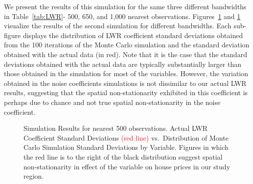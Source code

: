 \documentclass{article}\usepackage{graphicx, color}
\begin{document}
We present the results of this simulation for the same three different bandwidths in Table~\ref{tab:LWR}- 500, 650, and 1,000 nearest observations. Figures~\ref{fig:MCsds500} and \ref{fig:MCsds500} visualize the results of the second simulation for different bandwidths. Each sub-figure displays the distribution of LWR coefficient standard deviations obtained from the 100 iterations of the Monte Carlo simulation and the standard deviation obtained with the actual data (in red). Note that it is the case that the standard deviations obtained with the actual data are typically substantially larger than those obtained in the simulation for most of the variables. However, the variation obtained in the noise coefficients simulations is not dissimilar to our actual LWR results, suggesting that the spatial non-stationarity exhibited in this coefficient is perhaps due to chance and not true spatial non-stationarity in the noise coefficient. 

\begin{figure}
 \caption{Simulation Results for nearest 500 observations. Actual LWR Coefficient Standard Deviations \textcolor{red}{(red line)} vs.\ Distribution of Monte Carlo Simulation Standard Deviations by Variable. Figures in which the red line is to the right of the black distribution suggest spatial non-stationarity in effect of the variable on house prices in our study region.}\label{fig:MCsds500}
\end{figure}
\end{document}
